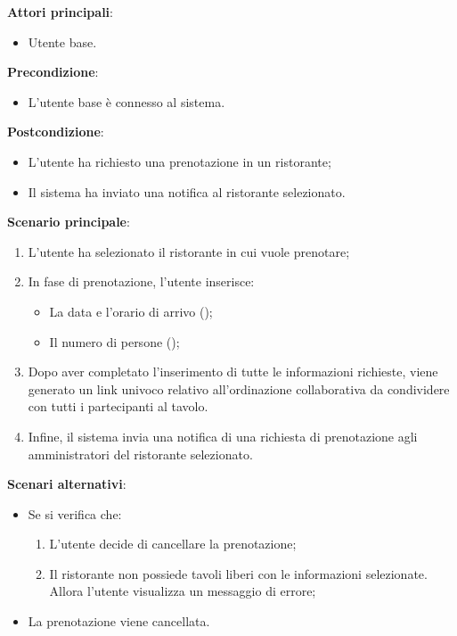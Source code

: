 \textbf{Attori principali}:
\begin{itemize}
    \item Utente base.
\end{itemize}
\textbf{Precondizione}:
\begin{itemize}
    \item L'utente base è connesso al sistema.
\end{itemize}
\textbf{Postcondizione}:
\begin{itemize}
    \item L'utente ha richiesto una prenotazione in un ristorante;
    \item Il sistema ha inviato una notifica al ristorante selezionato.
\end{itemize}
\textbf{Scenario principale}:
\begin{enumerate}
    \item L'utente ha selezionato il ristorante in cui vuole prenotare;
    \item In fase di prenotazione, l'utente inserisce:
    \begin{itemize}
        \item La data e l'orario di arrivo ();
        \item Il numero di persone ();
    \end{itemize}
    \item Dopo aver completato l'inserimento di tutte le informazioni richieste, viene generato un link univoco relativo all'ordinazione collaborativa da condividere con tutti i partecipanti al tavolo. 
    \item Infine, il sistema invia una notifica di una richiesta di prenotazione agli amministratori del ristorante selezionato.
\end{enumerate}
\textbf{Scenari alternativi}:
\begin{itemize}
    \item Se si verifica che:
    \begin{enumerate}
        \item L'utente decide di cancellare la prenotazione;
        \item Il ristorante non possiede tavoli liberi con le informazioni selezionate. Allora l'utente visualizza un messaggio di errore;
    \end{enumerate}
    \item La prenotazione viene cancellata.
\end{itemize}



